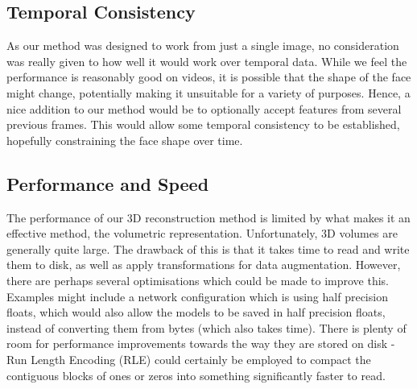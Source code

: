 \subsection{Temporal Consistency}

As our method was designed to work from just a single image, no
consideration was really given to how well it would work over temporal
data. While we feel the performance is reasonably good on videos, it
is possible that the shape of the face might change, potentially
making it unsuitable for a variety of purposes. Hence, a nice addition
to our method would be to optionally accept features from several
previous frames. This would allow some temporal consistency to be
established, hopefully constraining the face shape over time.

\subsection{Performance and Speed}

The performance of our 3D reconstruction method is limited by what
makes it an effective method, the volumetric
representation. Unfortunately, 3D volumes are generally quite
large. The drawback of this is that it takes time to read and write
them to disk, as well as apply transformations for data
augmentation. However, there are perhaps several optimisations which
could be made to improve this. Examples might include a network
configuration which is using half precision floats, which would also
allow the models to be saved in half precision floats, instead of
converting them from bytes (which also takes time). There is plenty of
room for performance improvements towards the way they are stored on
disk - Run Length Encoding (RLE) could certainly be employed to
compact the contiguous blocks of ones or zeros into something
significantly faster to read.


